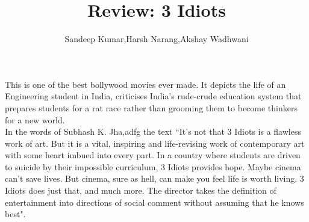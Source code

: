 \documentclass{article}
\title{Review: 3 Idiots}
\author{Sandeep Kumar,Harsh Narang,Akshay Wadhwani}
\begin{document}
\maketitle
This is one of the best bollywood movies ever made. It depicts the life of an Engineering student in India, criticises India's rude-crude education system that prepares students for a rat race rather than grooming them to become thinkers for a new world.\\
In the words of Subhash K. Jha,adfg the text ``It's not that 3 Idiots is a flawless work of art. But it is a vital, inspiring and life-revising work of contemporary art with some heart imbued into every part. In a country where students are driven to suicide by their impossible curriculum, 3 Idiots provides hope. Maybe cinema can't save lives. But cinema, sure as hell, can make you feel life is worth living. 3 Idiots does just that, and much more. The director takes the definition of entertainment into directions of social comment without assuming that he knows best".\\
\end{document}
